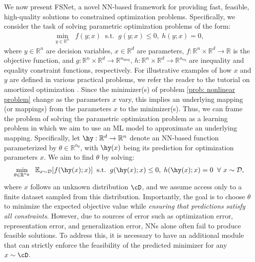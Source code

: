 \documentclass{article}
\def\R{\mathbb{R}}
\def\E{\mathbb{E}}
\def\st{\text{s.t.}}
\def\x{x}
\begin{document}
We now present FSNet, a novel NN-based framework for providing fast, feasible, high-quality solutions to constrained optimization problems. Specifically, we consider the task of solving parametric optimization problems of the form:  
\begin{align} \label{prob: nonlinear problem}
	\min_{ y \in \R^n} \;\; f(y; \x) \;\; \st \;\; g (y; \x) \leq 0, \; h (y; \x) = 0,
\end{align}
%
where $y \in \R^n$ are decision variables, $\x \in \R^d$ are parameters, $f: \R^n \times \R^d \rightarrow \R$ is the objective function, and $g:\R^n \times \R^d \rightarrow \R^{n_\mathrm{ineq}}$, 
$h: \R^n \times \R^d \rightarrow \R^{n_\mathrm{eq}}$  are inequality and equality constraint functions, respectively.
For illustrative examples of how $x$ and $y$ are defined in various practical problems, we refer the reader to the tutorial on amortized optimization \cite{amos2023tutorial}.
Since the minimizer(s) of problem \eqref{prob: nonlinear problem} change as the parameters $\x$ vary, this implies an underlying mapping (or mappings) from the parameters $\x$ to the minimizer(s).
Thus, we can frame the problem of solving the parametric optimization problem as a learning problem in which we aim to 
use an ML model to 
approximate an underlying mapping.
Specifically, let $\hy: \R^d \rightarrow \R^n$ denote an NN-based function parameterized by $\theta \in \R^{n_\theta}$, with $\hy(\x)$ being its prediction for optimization parameters $\x$. 
We aim to find $\theta$ by solving: 
\begin{align}\label{prob: learning}
    \min_{\theta \in \R^{n_\theta}} \;\; \E_{\x \sim \mathcal{D}} [f(\hy(\x); \x)] \;\; \st \;\; g (\hy(\x); \x) \leq 0, \; h (\hy(\x); \x) = 0 \;\; \forall~x \sim \mathcal{D},
\end{align}
where $\x$ follows an unknown distribution $\cD$, and we assume access only to a finite dataset sampled from this distribution.
Importantly, the goal is to choose $\theta$ to minimize the expected objective value while \emph{ensuring that predictions satisfy all constraints}.
However, due to sources of error such as optimization error, representation error, and generalization error, NNs alone often fail to produce feasible solutions. 
To address this, it is necessary to have an additional module that can strictly enforce the feasibility of the predicted minimizer for any $\x \sim \cD$.
\end{document}
